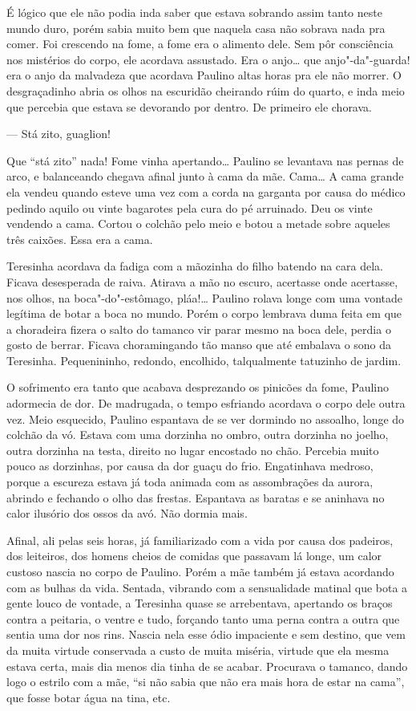 É lógico que ele não podia inda saber que estava sobrando assim tanto
neste mundo duro, porém sabia muito bem que naquela casa não sobrava
nada pra comer. Foi crescendo na fome, a fome era o alimento dele. Sem
pôr consciência nos mistérios do corpo, ele acordava assustado. Era o
anjo\ldots{} que anjo"-da"-guarda! era o anjo da malvadeza que acordava Paulino
altas horas pra ele não morrer. O desgraçadinho abria os olhos na
escuridão cheirando rúim do quarto, e inda meio que percebia que estava
se devorando por dentro. De primeiro ele chorava.

--- Stá zito, guaglion!

Que ``stá zito'' nada! Fome vinha apertando\ldots{} Paulino se levantava nas
pernas de arco, e balanceando chegava afinal junto à cama da mãe.
Cama\ldots{} A cama grande ela vendeu quando esteve uma vez com a corda na
garganta por causa do médico pedindo aquilo ou vinte bagarotes pela cura
do pé arruinado. Deu os vinte vendendo a cama. Cortou o colchão pelo
meio e botou a metade sobre aqueles três caixões. Essa era a cama.

Teresinha acordava da fadiga com a mãozinha do filho batendo na cara
dela. Ficava desesperada de raiva. Atirava a mão no escuro, acertasse
onde acertasse, nos olhos, na boca"-do"-estômago, pláa!\ldots{} Paulino rolava
longe com uma vontade legítima de botar a boca no mundo. Porém o corpo
lembrava duma feita em que a choradeira fizera o salto do tamanco vir
parar mesmo na boca dele, perdia o gosto de berrar. Ficava choramingando
tão manso que até embalava o sono da Teresinha. Pequenininho, redondo,
encolhido, talqualmente tatuzinho de jardim.

O sofrimento era tanto que acabava desprezando os pinicões da fome,
Paulino adormecia de dor. De madrugada, o tempo esfriando acordava o
corpo dele outra vez. Meio esquecido, Paulino espantava de se ver
dormindo no assoalho, longe do colchão da vó. Estava com uma dorzinha no
ombro, outra dorzinha no joelho, outra dorzinha na testa, direito no
lugar encostado no chão. Percebia muito pouco as dorzinhas, por causa da
dor guaçu do frio. Engatinhava medroso, porque a escureza estava já toda
animada com as assombrações da aurora, abrindo e fechando o olho das
frestas. Espantava as baratas e se aninhava no calor ilusório dos ossos
da avó. Não dormia mais.

Afinal, ali pelas seis horas, já familiarizado com a vida por causa dos
padeiros, dos leiteiros, dos homens cheios de comidas que passavam lá
longe, um calor custoso nascia no corpo de Paulino. Porém a mãe também
já estava acordando com as bulhas da vida. Sentada, vibrando com a
sensualidade matinal que bota a gente louco de vontade, a Teresinha
quase se arrebentava, apertando os braços contra a peitaria, o ventre e
tudo, forçando tanto uma perna contra a outra que sentia uma dor nos
rins. Nascia nela esse ódio impaciente e sem destino, que vem da muita
virtude conservada a custo de muita miséria, virtude que ela mesma
estava certa, mais dia menos dia tinha de se acabar. Procurava o
tamanco, dando logo o estrilo com a mãe, ``si não sabia que não era mais
hora de estar na cama'', que fosse botar água na tina, etc.

